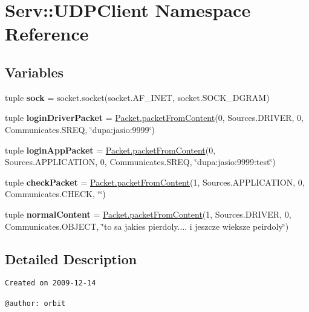 \hypertarget{namespace_serv_1_1_u_d_p_client}{
\section{Serv::UDPClient Namespace Reference}
\label{namespace_serv_1_1_u_d_p_client}
}
\subsection*{Variables}
\begin{CompactItemize}
\item 
\hypertarget{namespace_serv_1_1_u_d_p_client_26010463e2557dd99ea69558ac84b513}{
tuple \textbf{sock} = socket.socket(socket.AF\_\-INET, socket.SOCK\_\-DGRAM)}
\label{namespace_serv_1_1_u_d_p_client_26010463e2557dd99ea69558ac84b513}

\item 
\hypertarget{namespace_serv_1_1_u_d_p_client_6a7c093d00705f1a7a45121724849c7a}{
tuple \textbf{loginDriverPacket} = \hyperlink{class_serv_1_1_packet_1_1_packet_145ac89df7bc66728e8b3e642650aff4}{Packet.packetFromContent}(0, Sources.DRIVER, 0, Communicates.SREQ, \char`\"{}dupa:jasio:9999\char`\"{})}
\label{namespace_serv_1_1_u_d_p_client_6a7c093d00705f1a7a45121724849c7a}

\item 
\hypertarget{namespace_serv_1_1_u_d_p_client_8224433da892f0816d12f588d2c55cb5}{
tuple \textbf{loginAppPacket} = \hyperlink{class_serv_1_1_packet_1_1_packet_145ac89df7bc66728e8b3e642650aff4}{Packet.packetFromContent}(0, Sources.APPLICATION, 0, Communicates.SREQ, \char`\"{}dupa:jasio:9999:test\char`\"{})}
\label{namespace_serv_1_1_u_d_p_client_8224433da892f0816d12f588d2c55cb5}

\item 
\hypertarget{namespace_serv_1_1_u_d_p_client_5ca5a80c0fb3b47ffa84794ed8d3352e}{
tuple \textbf{checkPacket} = \hyperlink{class_serv_1_1_packet_1_1_packet_145ac89df7bc66728e8b3e642650aff4}{Packet.packetFromContent}(1, Sources.APPLICATION, 0, Communicates.CHECK, \char`\"{}\char`\"{})}
\label{namespace_serv_1_1_u_d_p_client_5ca5a80c0fb3b47ffa84794ed8d3352e}

\item 
\hypertarget{namespace_serv_1_1_u_d_p_client_f4d57687ceee96cbdac42b143b2dd99f}{
tuple \textbf{normalContent} = \hyperlink{class_serv_1_1_packet_1_1_packet_145ac89df7bc66728e8b3e642650aff4}{Packet.packetFromContent}(1, Sources.DRIVER, 0, Communicates.OBJECT, \char`\"{}to sa jakies pierdoly.... i jeszcze wieksze peirdoly\char`\"{})}
\label{namespace_serv_1_1_u_d_p_client_f4d57687ceee96cbdac42b143b2dd99f}

\end{CompactItemize}


\subsection{Detailed Description}


\footnotesize\begin{verbatim}
Created on 2009-12-14

@author: orbit
\end{verbatim}
\normalsize
 

